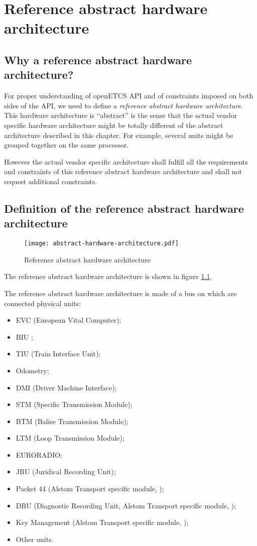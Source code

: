 \chapter{Reference abstract hardware architecture}

\section{Why a reference abstract hardware architecture?}

For proper understanding of openETCS API and of constraints imposed on
both sides of the API, we need to define a \emph{reference abstract
  hardware architecture}. This hardware architecture is ``abstract''
is the sense that the actual vendor specific hardware architecture
might be totally different of the abstract architecture described in
this chapter. For example, several units might be grouped together on
the same processor.

However the actual vendor specific architecture shall fulfill all the
requirements and constraints of this reference abstract hardware
architecture and shall not request additional constraints.

\section{Definition of the reference abstract hardware architecture}

\begin{figure}
  \centering
  \texttt{[image: abstract-hardware-architecture.pdf]}
  \caption{Reference abstract hardware architecture}
  \label{fig:hardware-arch}
\end{figure}

The reference abstract hardware architecture is shown in figure
\ref{fig:hardware-arch}.

The reference abstract hardware architecture is made of a bus on which
are connected physical units:
\begin{itemize}
\item EVC (European Vital Computer);
\item BIU ;
\item TIU (Train Interface Unit);
\item Odometry;
\item DMI (Driver Machine Interface);
\item STM (Specific Transmission Module);
\item BTM (Balise Transmission Module);
\item LTM (Loop Transmission Module);
\item EURORADIO;
\item JRU (Juridical Recording Unit);
\item Packet 44 (Alstom Transport specific module, \cite{alstom-api});
\item DRU (Diagnostic Recording Unit, Alstom Transport specific
  module, \cite{alstom-api});
\item Key Management (Alstom Transport specific module,
  \cite{alstom-api});
\item Other units.
\end{itemize}

